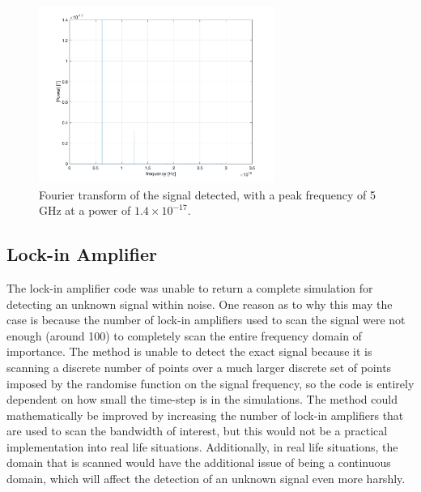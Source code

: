 \documentclass[a4paper,12pt, notitlepage]{article}
\begin{document}
\begin{figure}[b!]
\centering
\includegraphics[width=77mm]{pictures/transform.png}
\vspace{-2mm}
\caption{Fourier transform of the signal detected, with a peak frequency of 5 GHz at a power of $1.4\times10^{-17}$.}
\label{fig:fourierTransform}
\end{figure}
\subsection{Lock-in Amplifier}
The lock-in amplifier code was unable to return a complete simulation for detecting an unknown signal within noise. One reason as to why this may the case is because the number of lock-in amplifiers used to scan the signal were not enough (around 100) to completely scan the entire frequency domain of importance. The method is unable to detect the exact signal because it is scanning a discrete number of points over a much larger discrete set of points imposed by the randomise function on the signal frequency, so the code is entirely dependent on how small the time-step is in the simulations. The method could mathematically be improved by increasing the number of lock-in amplifiers that are used to scan the bandwidth of interest, but this would not be a practical implementation into real life situations. Additionally, in real life situations, the domain that is scanned would have the additional issue of being a continuous domain, which will affect the detection of an unknown signal even more harshly. 
\end{document}
